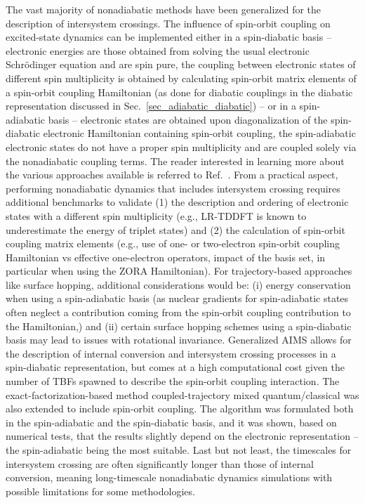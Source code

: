 \documentclass[9pt,bestpractices]{livecoms}
\begin{document}
\begin{itemize}
{The vast majority of nonadiabatic methods have been generalized for the description of intersystem crossings. The influence of spin-orbit coupling on excited-state dynamics can be implemented either in a spin-diabatic basis -- electronic energies are those obtained from solving the usual electronic Schr\"{o}dinger equation and are spin pure, the coupling between electronic states of different spin multiplicity is obtained by calculating spin-orbit matrix elements of a spin-orbit coupling Hamiltonian (as done for diabatic couplings in the diabatic representation discussed in Sec.~\ref{sec_adiabatic_diabatic}) -- or in a spin-adiabatic basis -- electronic states are obtained upon diagonalization of the spin-diabatic electronic Hamiltonian containing spin-orbit coupling, the spin-adiabatic electronic states do not have a proper spin multiplicity and are coupled solely via the nonadiabatic coupling terms.\cite{michl,mai2015IJQC,granucci:22A501} The reader interested in learning more about the various approaches available is referred to Ref.~. From a practical aspect, performing nonadiabatic dynamics that includes intersystem crossing requires additional benchmarks to validate (1) the description and ordering of electronic states with a different spin multiplicity (e.g., LR-TDDFT is known to underestimate the energy of triplet states\cite{peach2011influence}) and (2) the calculation of spin-orbit coupling matrix elements (e.g., use of one- or two-electron spin-orbit coupling Hamiltonian vs effective one-electron operators, impact of the basis set, in particular when using the ZORA Hamiltonian). For trajectory-based approaches like surface hopping, additional considerations would be: (i) energy conservation when using a spin-adiabatic basis (as nuclear gradients for spin-adiabatic states often neglect a contribution coming from the spin-orbit coupling contribution to the Hamiltonian,\cite{mai2015IJQC}) and (ii) certain surface hopping schemes using a spin-diabatic basis may lead to issues with rotational invariance.\cite{granucci:22A501} 
Generalized AIMS allows for the description of internal conversion and intersystem crossing processes in a spin-diabatic representation, but comes at a high computational cost given the number of TBFs spawned to describe the spin-orbit coupling interaction.\cite{curchod2016communication,varganovGAIMS2021}
The exact-factorization-based method coupled-trajectory mixed quantum/classical was also extended to include spin-orbit coupling.\cite{talotta2020soc} The algorithm was formulated both in the spin-adiabatic and the spin-diabatic basis, and it was shown, based on numerical tests, that the results slightly depend on the electronic representation -- the spin-adiabatic being the most suitable. Last but not least, the timescales for intersystem crossing are often significantly longer than those of internal conversion, meaning long-timescale nonadiabatic dynamics simulations\cite{favero2013dynamics} with possible limitations for some methodologies.\cite{Mukherjeelongtime2025}}  


\end{itemize}
\end{document}
